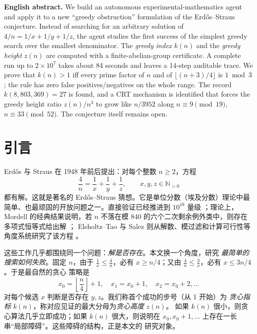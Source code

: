 \documentclass[11pt,a4paper]{ctexart}
\theoremstyle{definition}
\theoremstyle{remark}
\newcommand{\N}{\mathbb{N}}
\begin{document}
\vspace{0.5em}
\begin{center}
\begin{minipage}{0.93\textwidth}
\small
\textbf{English abstract.}
We build an autonomous experimental-mathematics agent and apply it to a new
``greedy obstruction'' formulation of the Erdős--Straus conjecture. Instead of
searching for an arbitrary solution of $4/n=1/x+1/y+1/z$, the agent studies the
first success of the simplest greedy search over the smallest denominator.
The \emph{greedy index} $k(n)$ and the \emph{greedy height} $z(n)$ are computed
with a finite-abelian-group certificate.  A complete run up to $2\times10^7$
takes about 84 seconds and leaves a 14-step auditable trace.  We prove that
$k(n)>1$ iff every prime factor of $n$ and of $\lfloor(n+3)/4\rfloor$ is
$1\bmod 3$; the rule has zero false positives/negatives on the whole range.
The record $k(8{,}803{,}369)=27$ is found, and a CRT mechanism is identified
that forces the greedy height ratio $z(n)/n^3$ to grow like $n/3952$ along
$n\equiv9\pmod{19}$, $n\equiv33\pmod{52}$.  The conjecture itself remains open.
\end{minipage}
\end{center}

\tableofcontents
\newpage

\section{引言}

Erdős 与 Straus 在 1948 年前后提出\cite{erdos1950}：对每个整数 $n\ge2$，方程
\begin{equation}\label{eq:ES}
\frac{4}{n}=\frac{1}{x}+\frac{1}{y}+\frac{1}{z},
\qquad x,y,z\in\N_{>0}
\end{equation}
都有解。这就是著名的 Erdős--Straus 猜想。它是单位分数（埃及分数）理论中最
简单、也最顽固的开放问题之一。直接验证已经推进到 $10^{18}$ 量级
\cite{mihnea2025}；理论上，Mordell 的经典结果说明，若 $n$ 不落在模 $840$
的六个二次剩余例外类中，则存在多项式恒等式给出解 \cite{mordell1967}；
Elsholtz--Tao 与 Salez 则从解数、模过滤和计算可行性等角度系统研究了该方程
\cite{elsholtz2013,salez2014}。

这些工作几乎都围绕同一个问题：\emph{解是否存在}。本文换一个角度，研究
\emph{最简单的搜索如何失败}。固定 $n$，由于 $\frac1x\le\frac4n$，必有
$x\ge n/4$；又由 $\frac4n\le\frac3x$，必有 $x\le3n/4$。于是最自然的贪心
策略是
\[
x_0=\left\lfloor\frac n4\right\rfloor+1,\quad
x_1=x_0+1,\quad x_2=x_0+2,\ldots
\]
对每个候选 $x$ 判断是否存在 $y,z$。我们称首个成功的步号（从 1 开始）为
\emph{贪心指标} $k(n)$，称对应见证的最大分母为\emph{贪心高度} $z(n)$。
如果 $k(n)$ 很小，则贪心算法几乎立即成功；如果 $k(n)$ 很大，则说明在
$x_0,x_0+1,\ldots$ 上存在一长串“局部障碍”。这些障碍的结构，正是本文的
研究对象。
\end{document}

